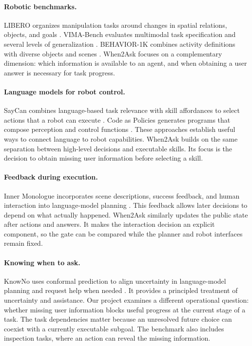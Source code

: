 \documentclass{article}
\begin{document}
\paragraph{Robotic benchmarks.}
LIBERO organizes manipulation tasks around changes in spatial relations,
objects, and goals \citep{liu2023libero}. VIMA-Bench evaluates multimodal task
specification and several levels of generalization \citep{jiang2023vima}.
BEHAVIOR-1K combines activity definitions with diverse objects and scenes
\citep{li2023behavior}. When2Ask focuses on a complementary dimension:
which information is available to an agent, and when obtaining a user answer
is necessary for task progress.

\paragraph{Language models for robot control.}
SayCan combines language-based task relevance with skill affordances to select
actions that a robot can execute \citep{ahn2022saycan}. Code as Policies
generates programs that compose perception and control functions
\citep{liang2022code}. These approaches establish useful ways to connect
language to robot capabilities. When2Ask builds on the same separation between
high-level decisions and executable skills. Its focus is the decision to obtain
missing user information before selecting a skill.

\paragraph{Feedback during execution.}
Inner Monologue incorporates scene descriptions, success feedback, and human
interaction into language-model planning \citep{huang2022inner}. This feedback
allows later decisions to depend on what actually happened. When2Ask similarly
updates the public state after actions and answers. It makes the interaction
decision an explicit component, so the gate can be compared while the planner
and robot interfaces remain fixed.

\paragraph{Knowing when to ask.}
KnowNo uses conformal prediction to align uncertainty in language-model
planning and request help when needed \citep{ren2023knowno}. It provides a
principled treatment of uncertainty and assistance. Our project examines a
different operational question: whether missing user information blocks
useful progress at the current stage of a task. The task dependencies matter
because an unresolved future choice can coexist with a currently executable
subgoal. The benchmark also includes inspection tasks, where an action can
reveal the missing information.
\end{document}
